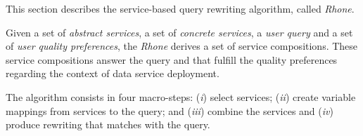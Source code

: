 This section describes the service-based query rewriting algorithm, called
\textit{Rhone}.%
%

Given a set of \textit{abstract services}, a set of \textit{concrete services}, a
\textit{user query} and a set of \textit{user quality preferences}, the
\textit{Rhone} derives a set of service compositions. These service compositions 
answer the query and that fulfill the quality preferences regarding the context of data service deployment.
%

%
The algorithm consists in four macro-steps: 
(\textit{i}) select services; 
(\textit{ii}) create variable mappings from services to the query; and 
(\textit{iii}) combine the services and 
(\textit{iv}) produce rewriting that matches with the query. 
\bigskip